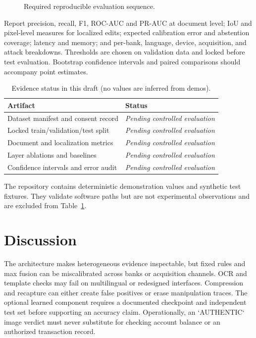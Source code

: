 \documentclass[conference]{IEEEtran}
\newcommand{\pending}{\textit{Pending controlled evaluation}}
\begin{document}
\begin{figure}[t]
\centering
{}
\caption{Required reproducible evaluation sequence.}
\label{fig:evaluation}
\end{figure}

Report precision, recall, F1, ROC-AUC and PR-AUC at document level; IoU and
pixel-level measures for localized edits; expected calibration error and
abstention coverage; latency and memory; and per-bank, language, device,
acquisition, and attack breakdowns. Thresholds are chosen on validation data and
locked before test evaluation. Bootstrap confidence intervals and paired
comparisons should accompany point estimates.

\begin{table}[t]
\caption{Evidence status in this draft (no values are inferred from demos).}
\label{tab:results}
\centering
\begin{tabular}{lp{}}
\toprule
Artifact & Status \\
\midrule
Dataset manifest and consent record & \pending \\
Locked train/validation/test split & \pending \\
Document and localization metrics & \pending \\
Layer ablations and baselines & \pending \\
Confidence intervals and error audit & \pending \\
\bottomrule
\end{tabular}
\end{table}

The repository contains deterministic demonstration values and synthetic test
fixtures. They validate software paths but are not experimental observations and
are excluded from Table~\ref{tab:results}.

\section{Discussion}
The architecture makes heterogeneous evidence inspectable, but fixed rules and
max fusion can be miscalibrated across banks or acquisition channels. OCR and
template checks may fail on multilingual or redesigned interfaces. Compression
and recapture can either create false positives or erase manipulation traces.
The optional learned component requires a documented checkpoint and independent
test set before supporting an accuracy claim. Operationally, an `AUTHENTIC`
image verdict must never substitute for checking account balance or an
authorized transaction record.
\end{document}
